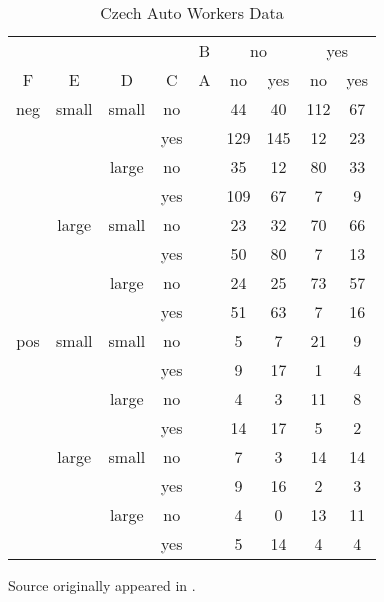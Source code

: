 \documentclass[a4paper]{article}
\begin{document}
\begin{appendix}
\begin{table}[H]
  \centering
  \begin{tabular}{cccc|ccccc} \hline
    &       &       &     &B &  \multicolumn{2}{c}{no} & \multicolumn{2}{c}{yes} \\
F   &  E    &  D    & C   &A &  no & yes & no  & yes \\ \hline
neg & small & small & no  &  &  44 &  40 & 112 &  67 \\
    &       &       & yes &  & 129 & 145 &  12 &  23 \\
    &       & large & no  &  &  35 &  12 &  80 &  33 \\
    &       &       & yes &  & 109 &  67 &   7 &   9 \\
    & large & small & no  &  &  23 &  32 &  70 &  66 \\
    &       &       & yes &  &  50 &  80 &   7 &  13 \\
    &       & large & no  &  &  24 &  25 &  73 &  57 \\
    &       &       & yes &  &  51 &  63 &   7 &  16 \\
pos & small & small & no  &  &   5 &   7 &  21 &   9 \\
    &       &       & yes &  &   9 &  17 &   1 &   4 \\
    &       & large & no  &  &   4 &   3 &  11 &   8 \\
    &       &       & yes &  &  14 &  17 &   5 &   2 \\
    & large & small & no  &  &   7 &   3 &  14 &  14 \\
    &       &       & yes &  &   9 &  16 &   2 &   3 \\
    &       & large & no  &  &   4 &   0 &  13 &  11 \\
    &       &       & yes &  &   5 &  14 &   4 &   4 \\ \hline
  \end{tabular}             
  \caption{Czech Auto Workers Data}
  Source \cite{dobra} originally appeared in \cite{edwards}.
  \label{tab:czech}
\end{table}


\end{appendix}
\end{document}
